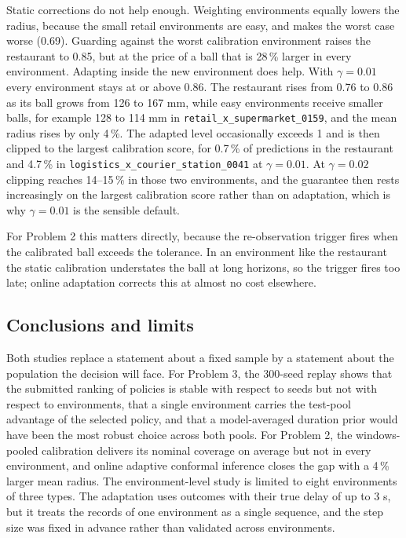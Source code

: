 Static corrections do not help enough. Weighting environments equally lowers the radius, because the small retail environments are easy, and makes the worst case worse (0.69). Guarding against the worst calibration environment raises the restaurant to 0.85, but at the price of a ball that is 28\,\% larger in every environment. Adapting inside the new environment does help. With $\gamma=0.01$ every environment stays at or above 0.86. The restaurant rises from 0.76 to 0.86 as its ball grows from 126 to 167 mm, while easy environments receive smaller balls, for example 128 to 114 mm in \texttt{retail\_x\_supermarket\_0159}, and the mean radius rises by only 4\,\%. The adapted level occasionally exceeds 1 and is then clipped to the largest calibration score, for 0.7\,\% of predictions in the restaurant and 4.7\,\% in \texttt{logistics\_x\_courier\_station\_0041} at $\gamma=0.01$. At $\gamma=0.02$ clipping reaches 14--15\,\% in those two environments, and the guarantee then rests increasingly on the largest calibration score rather than on adaptation, which is why $\gamma=0.01$ is the sensible default.

For Problem 2 this matters directly, because the re-observation trigger fires when the calibrated ball exceeds the tolerance. In an environment like the restaurant the static calibration understates the ball at long horizons, so the trigger fires too late; online adaptation corrects this at almost no cost elsewhere.

\subsection{Conclusions and limits}

Both studies replace a statement about a fixed sample by a statement about the population the decision will face. For Problem 3, the 300-seed replay shows that the submitted ranking of policies is stable with respect to seeds but not with respect to environments, that a single environment carries the test-pool advantage of the selected policy, and that a model-averaged duration prior would have been the most robust choice across both pools. For Problem 2, the windows-pooled calibration delivers its nominal coverage on average but not in every environment, and online adaptive conformal inference closes the gap with a 4\,\% larger mean radius. The environment-level study is limited to eight environments of three types. The adaptation uses outcomes with their true delay of up to 3 s, but it treats the records of one environment as a single sequence, and the step size was fixed in advance rather than validated across environments.

